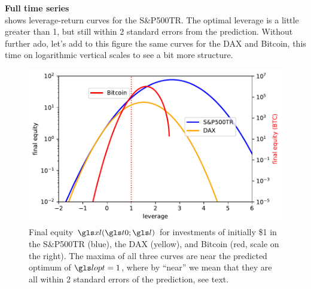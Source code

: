 \textbf{Full time series}\\
 shows leverage-return curves for the S\&P500TR. The optimal leverage is a little greater than 1, but still within 2 standard errors from the prediction. Without further ado, let's add to this figure the same curves for the DAX and Bitcoin, this time on logarithmic vertical scales to see a bit more structure.
\begin{figure}
\centering
\includegraphics[width=\textwidth]{./chapter_4/figs/all_final_equity.pdf}
\caption{Final equity $\xl(\tn; \l)$ for investments of initially \$1 in the S\&P500TR (blue), the DAX (yellow), and Bitcoin (red, scale on the right). The maxima of all three curves are near the predicted optimum of $\lopt=1$, where by ``near'' we mean that they are all within 2 standard errors of the prediction, see text.
}
\end{figure}

